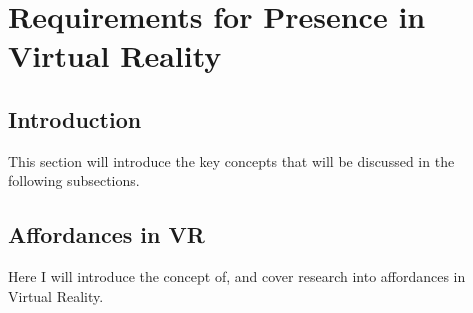 \section{Requirements for Presence in Virtual Reality}
\label{lr:vr}

	
	\subsection{Introduction}
	\label{lr:vr:intro}
		This section will introduce the key concepts that will be discussed in the following subsections.
%		
	
	\subsection{Affordances in VR}
	\label{lr:vr:affordances}
		Here I will introduce the concept of, and cover research into affordances in Virtual Reality.
		
